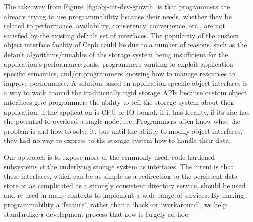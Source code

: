 The takeaway from Figure~\ref{fig:obj-int-dev-growth} is that programmers are
already trying to use programmability because their needs, whether they be
related to performance, availability, consistency, convenience, etc., are not
satisfied by the existing default set of interfaces. The popularity of the
custom object interface facility of Ceph could be due to a number of reasons,
such as the default algorithms/tunables of the storage system being
insufficient for the application's performance goals, programmers wanting to
exploit application-specific semantics, and/or programmers knowing how to
manage resources to improve performance. A solution based on
application-specific object interfaces is a way to work around the
traditionally rigid storage APIs because custom object interfaces give
programmers the ability to tell the storage system about their application: if
the application is CPU or IO bound, if it has locality, if its size has the
potential to overload a single node, etc.  Programmers often know what the
problem is and how to solve it, but until the ability to modify object
interfaces, they had no way to express to the storage system how to handle
their data.

Our approach is to expose more of the commonly used, code-hardened subsystems
of the underlying storage system as interfaces. The intent is that these
interfaces, which can be as simple as a redirection to the persistent data
store or as complicated as a strongly consistent directory service, should be
used and re-used in many contexts to implement a wide range of services. By
making programmability a `feature', rather than a `hack' or `workaround', we
help standardize a development process that now is largely ad-hoc.
